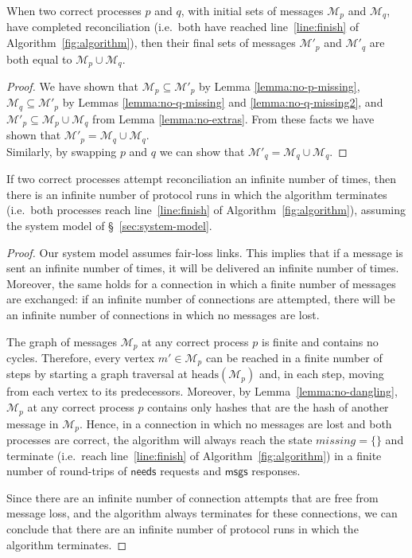 \documentclass[a4paper,anonymous,USenglish]{lipics-v2019}
\begin{document}
\begin{lemma}\label{lemma:reconcile-equal}
When two correct processes $p$ and $q$, with initial sets of messages $\mathcal{M}_p$ and $\mathcal{M}_q$, have completed reconciliation (i.e.\ both have reached line~\ref{line:finish} of Algorithm~\ref{fig:algorithm}), then their final sets of messages $\mathcal{M}'_p$ and $\mathcal{M}'_q$  are both equal to $\mathcal{M}_p \cup \mathcal{M}_q$.
\end{lemma}
\begin{proof}
We have shown that $\mathcal{M}_p \subseteq \mathcal{M}'_p$ by Lemma \ref{lemma:no-p-missing}, $\mathcal{M}_q \subseteq \mathcal{M}'_p$ by Lemmas \ref{lemma:no-q-missing} and \ref{lemma:no-q-missing2}, and $\mathcal{M}'_p \subseteq \mathcal{M}_p \cup \mathcal{M}_q$ from Lemma \ref{lemma:no-extras}.
From these facts we have shown that $\mathcal{M}'_p = \mathcal{M}_q \cup \mathcal{M}_q$.\\
Similarly, by swapping $p$ and $q$ we can show that $\mathcal{M}'_q = \mathcal{M}_q \cup \mathcal{M}_q$.
\end{proof}

\begin{lemma}\label{lemma:termination}
If two correct processes attempt reconciliation an infinite number of times, then there is an infinite number of protocol runs in which the algorithm terminates (i.e.\ both processes reach line~\ref{line:finish} of Algorithm~\ref{fig:algorithm}), assuming the system model of \S~\ref{sec:system-model}.
\end{lemma}
\begin{proof}
Our system model assumes fair-loss links.
This implies that if a message is sent an infinite number of times, it will be delivered an infinite number of times.
Moreover, the same holds for a connection in which a finite number of messages are exchanged: if an infinite number of connections are attempted, there will be an infinite number of connections in which no messages are lost.

The graph of messages $\mathcal{M}_p$ at any correct process $p$ is finite and contains no cycles.
Therefore, every vertex $m' \in \mathcal{M}_p$ can be reached in a finite number of steps by starting a graph traversal at $\mathrm{heads}(\mathcal{M}_p)$ and, in each step, moving from each vertex to its predecessors.
Moreover, by Lemma~\ref{lemma:no-dangling}, $\mathcal{M}_p$ at any correct process $p$ contains only hashes that are the hash of another message in $\mathcal{M}_p$.
Hence, in a connection in which no messages are lost and both processes are correct, the algorithm will always reach the state $\mathit{missing} = \{\}$ and terminate (i.e.\ reach line~\ref{line:finish} of Algorithm~\ref{fig:algorithm}) in a finite number of round-trips of $\mathsf{needs}$ requests and $\mathsf{msgs}$ responses.

Since there are an infinite number of connection attempts that are free from message loss, and the algorithm always terminates for these connections, we can conclude that there are an infinite number of protocol runs in which the algorithm terminates.
\end{proof}
\end{document}
